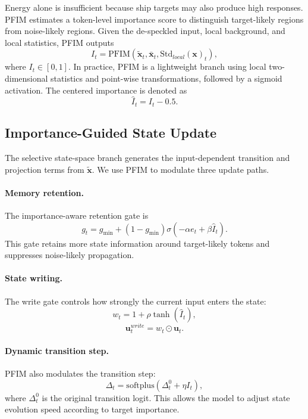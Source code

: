 \documentclass[10pt]{article}
\begin{document}
Energy alone is insufficient because ship targets may also produce high responses. PFIM estimates a token-level importance score to distinguish target-likely regions from noise-likely regions. Given the de-speckled input, local background, and local statistics, PFIM outputs
\begin{equation}
  I_t = \mathrm{PFIM}(\widetilde{\mathbf{x}}_t,\bar{\mathbf{x}}_t,\mathrm{Std}_{local}(\mathbf{x})_t),
\end{equation}
where $I_t\in[0,1]$. In practice, PFIM is a lightweight branch using local two-dimensional statistics and point-wise transformations, followed by a sigmoid activation. The centered importance is denoted as
\begin{equation}
  \hat{I}_t = I_t - 0.5.
\end{equation}

\subsection{Importance-Guided State Update}

The selective state-space branch generates the input-dependent transition and projection terms from $\widetilde{\mathbf{x}}$. We use PFIM to modulate three update paths.

\paragraph{Memory retention.}
The importance-aware retention gate is
\begin{equation}
  g_t = g_{\min} + (1-g_{\min})\sigma(-\alpha e_t + \beta \hat{I}_t).
  \label{eq:gamma}
\end{equation}
This gate retains more state information around target-likely tokens and suppresses noise-likely propagation.

\paragraph{State writing.}
The write gate controls how strongly the current input enters the state:
\begin{equation}
  w_t = 1 + \rho \tanh(\hat{I}_t),
\end{equation}
\begin{equation}
  \mathbf{u}^{write}_t = w_t \odot \mathbf{u}_t.
\end{equation}

\paragraph{Dynamic transition step.}
PFIM also modulates the transition step:
\begin{equation}
  \Delta_t = \mathrm{softplus}(\Delta^{0}_t + \eta I_t),
\end{equation}
where $\Delta^{0}_t$ is the original transition logit. This allows the model to adjust state evolution speed according to target importance.
\end{document}
